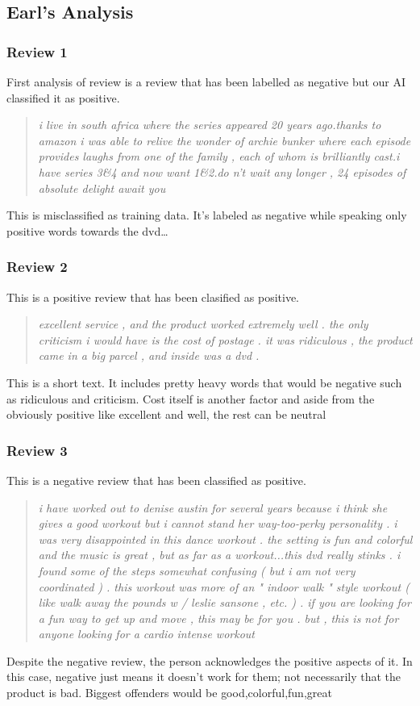 \documentclass[runningheads]{llncs}
\begin{document}
    \subsection{Earl's Analysis}
    \subsubsection{Review 1}
    First analysis of review is a review that has been labelled as negative but our AI classified it as positive.
    \begin{quotation}
        \textit{i live in south africa where the series appeared 20 years ago.thanks to amazon i was able to relive the wonder of archie bunker where each episode provides laughs from one of the family , each of whom is brilliantly cast.i have series 3\&4 and now want 1\&2.do n't wait any longer , 24 episodes of absolute delight await you }

    \end{quotation}
    This is misclassified as training data. It's labeled as negative while speaking only positive words towards the dvd\dots

    \subsubsection{Review 2}
    This is a positive review that has been clasified as positive.
    \begin{quotation}
        \textit{excellent service , and the product worked extremely well . the only criticism i would have is the cost of postage . it was ridiculous , the product came in a big parcel , and inside was a dvd .}
    \end{quotation}
    This is a short text. It includes pretty heavy words that would be negative such as ridiculous and criticism. Cost itself is another factor and aside from the obviously positive like excellent and well, the rest can be neutral

    \subsubsection{Review 3}
    This is a negative review that has been classified as positive.
    \begin{quotation}
        \textit{i have worked out to denise austin for several years because i think she gives a good workout but i cannot stand her way-too-perky personality . i was very disappointed in this dance workout . the setting is fun and colorful and the music is great , but as far as a workout...this dvd really stinks . i found some of the steps somewhat confusing ( but i am not very coordinated ) . this workout was more of an " indoor walk " style workout ( like walk away the pounds w / leslie sansone , etc. ) . if you are looking for a fun way to get up and move , this may be for you . but , this is not for anyone looking for a cardio intense workout }
    \end{quotation}
    Despite the negative review, the person acknowledges the positive aspects of it. In this case, negative just means it doesn't work for them; not necessarily that the product is bad. Biggest offenders would be {good,colorful,fun,great}
\end{document}
